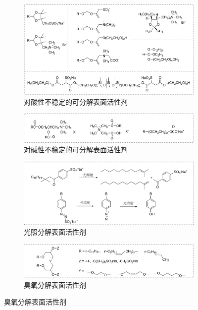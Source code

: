 \documentclass[bachelor,winfonts]{jnuthesis} %
\begin{document}
    \begin{figure}
        \centering
        \begin{subfigure}[b]{\textwidth}
            \centering
            \includegraphics[width=\textwidth]{Figure/cleavable-a.pdf}
            \caption{对酸性不稳定的可分解表面活性剂}\label{fig:cleavable-a}
        \end{subfigure}%
    
        \begin{subfigure}[b]{\textwidth}
            \centering
            \includegraphics[width=\textwidth]{Figure/cleavable-b.pdf}
            \caption{对碱性不稳定的可分解表面活性剂}\label{fig:cleavable-b}
        \end{subfigure}
    
        \begin{subfigure}[b]{\textwidth}
            \centering
            \includegraphics[width=\textwidth]{Figure/cleavable-c.pdf}
            \caption{光照分解表面活性剂}\label{fig:cleavable-c}
        \end{subfigure}%

        \begin{subfigure}[b]{\textwidth}
            \centering
            \includegraphics[width=\textwidth]{Figure/cleavable-d.pdf}
            \caption{臭氧分解表面活性剂}\label{fig:cleavable-d}
        \end{subfigure}
    \end{figure}
\end{document}
